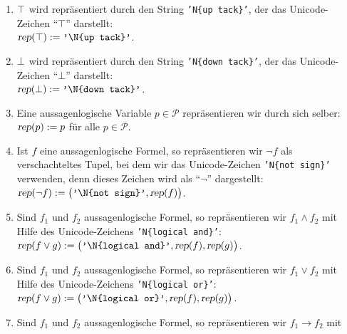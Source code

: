 \begin{enumerate}
\item $\top$ wird repräsentiert durch den String \texttt{'N\{up tack\}'}, der das Unicode-Zeichen
      ``$\top$'' darstellt: 
      \\[0.2cm]
      \hspace*{1.3cm}
      $\textsl{rep}(\verum) := \texttt{'\symbol{92}N\{up tack\}'}$.
\item $\bot$  wird repräsentiert durch den String \texttt{'N\{down tack\}'}, der das Unicode-Zeichen
     ``$\bot$'' darstellt:
      \\[0.2cm]
      \hspace*{1.3cm}
      $\textsl{rep}(\falsum) := \texttt{'\symbol{92}N\{down tack\}'}$.
\item Eine aussagenlogische Variable $p \in \mathcal{P}$ repräsentieren wir durch sich selber:
      \\[0.2cm]
      \hspace*{1.3cm}
      $\textsl{rep}(p) := p$ \quad für alle $p \in \mathcal{P}$.
\item Ist $f$ eine aussagenlogische Formel, so repräsentieren wir $\neg f$ als verschachteltes Tupel,
      bei dem wir das Unicode-Zeichen \texttt{'N\{not sign\}'} verwenden, denn dieses Zeichen wird
      als ``$\neg$'' dargestellt:
      \\[0.2cm]
      \hspace*{1.3cm} 
      $\textsl{rep}(\neg f) := \bigl(\texttt{'\symbol{92}N\{not sign\}'}, \textsl{rep}(f)\bigr)$.
\item Sind $f_1$ und $f_2$ aussagenlogische Formel, so repräsentieren wir $f_1 \wedge f_2$ mit
      Hilfe des Unicode-Zeichens  \texttt{'N\{logical and\}'}:
      \\[0.2cm]
      \hspace*{1.3cm} 
      $\textsl{rep}(f \vee g) := \bigl(\texttt{'\symbol{92}N\{logical and\}'}, \textsl{rep}(f), \textsl{rep}(g)\bigr)$.
\item Sind $f_1$ und $f_2$ aussagenlogische Formel, so repräsentieren wir $f_1 \vee f_2$ mit
      Hilfe des Unicode-Zeichens  \texttt{'N\{logical or\}'}:
      \\[0.2cm]
      \hspace*{1.3cm} 
      $\textsl{rep}(f \vee g) := \bigl(\texttt{'\symbol{92}N\{logical or\}'}, \textsl{rep}(f), \textsl{rep}(g)\bigr)$.
\item Sind $f_1$ und $f_2$ aussagenlogische Formel, so repräsentieren wir $f_1 \rightarrow f_2$ mit

\end{enumerate}
